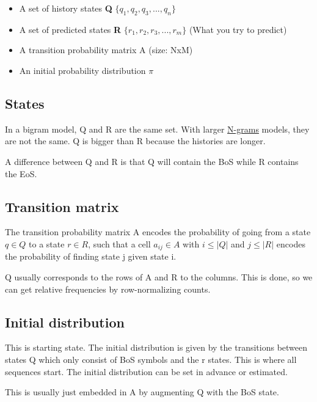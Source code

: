 \documentclass[
  11pt,
  british,
]{article}
\providecommand{\tightlist}{%
  \setlength{\itemsep}{0pt}\setlength{\parskip}{0pt}}
\begin{document}
\begin{itemize}
\tightlist
\item
  A set of history states \textbf{Q}
  \(\{q_{1},q_{2}, q_{3}, ..., q_{n}\}\)
\item
  A set of predicted states \textbf{R}
  \(\{r_{1},r_{2}, r_{3}, ..., r_{m}\}\) (What you try to predict)
\item
  A transition probability matrix A (size: NxM)
\item
  An initial probability distribution \(\pi\)
\end{itemize}

\hypertarget{states}{%
\subsection{States}\label{states}}

In a bigram model, Q and R are the same set. With larger
\href{../Languages/N-grams.md}{N-grams} models, they are not the same. Q
is bigger than R because the histories are longer.

A difference between Q and R is that Q will contain the BoS while R
contains the EoS.

\hypertarget{transition-matrix}{%
\subsection{Transition matrix}\label{transition-matrix}}

The transition probability matrix A encodes the probability of going
from a state \(q \in Q\) to a state \(r \in R\), such that a cell
\(a_{ij} \in A\) with \(i \leq |Q|\) and \(j \leq |R|\) encodes the
probability of finding state j given state i.

Q usually corresponds to the rows of A and R to the columns. This is
done, so we can get relative frequencies by row-normalizing counts.

\hypertarget{initial-distribution}{%
\subsection{Initial distribution}\label{initial-distribution}}

This is starting state. The initial distribution is given by the
transitions between states Q which only consist of BoS symbols and the r
states. This is where all sequences start. The initial distribution can
be set in advance or estimated.

This is usually just embedded in A by augmenting Q with the BoS state.
\end{document}
